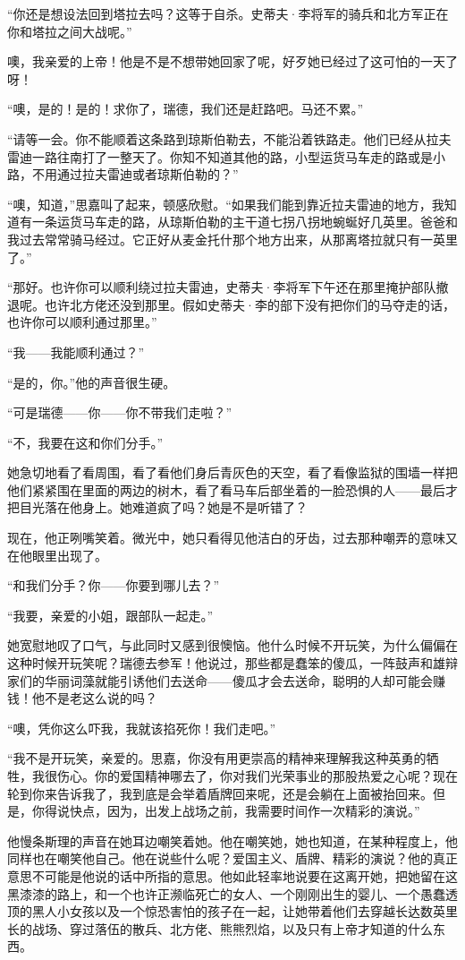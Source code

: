 \par “你还是想设法回到塔拉去吗？这等于自杀。史蒂夫·李将军的骑兵和北方军正在你和塔拉之间大战呢。”
\par 噢，我亲爱的上帝！他是不是不想带她回家了呢，好歹她已经过了这可怕的一天了呀！
\par “噢，是的！是的！求你了，瑞德，我们还是赶路吧。马还不累。”
\par “请等一会。你不能顺着这条路到琼斯伯勒去，不能沿着铁路走。他们已经从拉夫雷迪一路往南打了一整天了。你知不知道其他的路，小型运货马车走的路或是小路，不用通过拉夫雷迪或者琼斯伯勒的？”
\par “噢，知道，”思嘉叫了起来，顿感欣慰。“如果我们能到靠近拉夫雷迪的地方，我知道有一条运货马车走的路，从琼斯伯勒的主干道七拐八拐地蜿蜒好几英里。爸爸和我过去常常骑马经过。它正好从麦金托什那个地方出来，从那离塔拉就只有一英里了。”
\par “那好。也许你可以顺利绕过拉夫雷迪，史蒂夫·李将军下午还在那里掩护部队撤退呢。也许北方佬还没到那里。假如史蒂夫·李的部下没有把你们的马夺走的话，也许你可以顺利通过那里。”
\par “我——我能顺利通过？”
\par “是的，你。”他的声音很生硬。
\par “可是瑞德——你——你不带我们走啦？”
\par “不，我要在这和你们分手。”
\par 她急切地看了看周围，看了看他们身后青灰色的天空，看了看像监狱的围墙一样把他们紧紧围在里面的两边的树木，看了看马车后部坐着的一脸恐惧的人——最后才把目光落在他身上。她难道疯了吗？她是不是听错了？
\par 现在，他正咧嘴笑着。微光中，她只看得见他洁白的牙齿，过去那种嘲弄的意味又在他眼里出现了。
\par “和我们分手？你——你要到哪儿去？”
\par “我要，亲爱的小姐，跟部队一起走。”
\par 她宽慰地叹了口气，与此同时又感到很懊恼。他什么时候不开玩笑，为什么偏偏在这种时候开玩笑呢？瑞德去参军！他说过，那些都是蠢笨的傻瓜，一阵鼓声和雄辩家们的华丽词藻就能引诱他们去送命——傻瓜才会去送命，聪明的人却可能会赚钱！他不是老这么说的吗？
\par “噢，凭你这么吓我，我就该掐死你！我们走吧。”
\par “我不是开玩笑，亲爱的。思嘉，你没有用更崇高的精神来理解我这种英勇的牺牲，我很伤心。你的爱国精神哪去了，你对我们光荣事业的那股热爱之心呢？现在轮到你来告诉我了，我到底是会举着盾牌回来呢，还是会躺在上面被抬回来。但是，你得说快点，因为，出发上战场之前，我需要时间作一次精彩的演说。”
\par 他慢条斯理的声音在她耳边嘲笑着她。他在嘲笑她，她也知道，在某种程度上，他同样也在嘲笑他自己。他在说些什么呢？爱国主义、盾牌、精彩的演说？他的真正意思不可能是他说的话中所指的意思。他如此轻率地说要在这离开她，把她留在这黑漆漆的路上，和一个也许正濒临死亡的女人、一个刚刚出生的婴儿、一个愚蠢透顶的黑人小女孩以及一个惊恐害怕的孩子在一起，让她带着他们去穿越长达数英里长的战场、穿过落伍的散兵、北方佬、熊熊烈焰，以及只有上帝才知道的什么东西。

